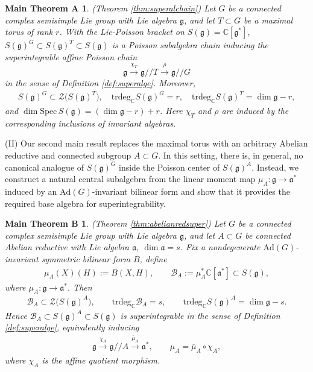 \documentclass[11pt,reqno]{amsart}
\newtheorem*{theorem A}{Main Theorem A}
\newtheorem*{theorem B}{Main Theorem B}
\newtheorem*{theorem C}{Main Theorem C}
\newtheorem*{theorem D}{Main Theorem D}
\theoremstyle{definition}
\theoremstyle{plain}
\theoremstyle{conclusion}
\begin{document}
\begin{theorem A} 
(Theorem \ref{thm:superalchain}) %
Let $G$ be a connected complex semisimple Lie group with Lie algebra $\mathfrak{g}$, and let $T\subset G$ be a maximal torus of rank $r$. With the Lie-Poisson bracket on $S(\mathfrak{g})=\mathbb{C}[\mathfrak{g}^*]$, $S(\mathfrak{g})^G\subset S(\mathfrak{g})^T\subset S(\mathfrak{g})$ is a Poisson subalgebra chain inducing the superintegrable affine Poisson chain
\begin{equation}
\mathfrak{g}\xrightarrow{\chi_T}\mathfrak{g}//T\xrightarrow{\rho}\mathfrak{g}//G
\label{eq:supgtc}
\end{equation}
in the sense of Definition \ref{def:superalge}. Moreover, \begin{align*}
S(\mathfrak{g})^G\subset\mathcal{Z}\bigl(S(\mathfrak{g})^T\bigr),\quad
\mathrm{trdeg}_{\mathbb{C}}S(\mathfrak{g})^G=r,\quad
\mathrm{trdeg}_{\mathbb{C}}S(\mathfrak{g})^T=\dim\mathfrak{g}-r,  
\end{align*} and $\dim\mathrm{Spec}\,S(\mathfrak{g})=(\dim\mathfrak{g}-r)+r$. Here $\chi_T$ and $\rho$ are induced by the corresponding inclusions of invariant algebras.
\end{theorem A}



(II) Our second main result replaces the maximal torus with an arbitrary Abelian reductive and connected subgroup $A \subset G$. In this setting, there is, in general, no canonical analogue of $S(\mathfrak{g})^G$ inside the Poisson center of $S(\mathfrak{g})^A$. Instead, we construct a natural central subalgebra from the linear moment map $\mu_A\colon\mathfrak{g}\to\mathfrak{a}^*$ induced by an $\mathrm{Ad}(G)$-invariant bilinear form and show that it provides the required base algebra for superintegrability.


\begin{theorem B}
  (Theorem \ref{thm:abelianredsuper})
Let $G$ be a connected complex semisimple Lie group with Lie algebra $\mathfrak{g}$, and let $A\subset G$ be connected Abelian reductive with Lie algebra $\mathfrak{a}$, $\dim\mathfrak{a}=s$. Fix a nondegenerate $\mathrm{Ad}(G)$-invariant symmetric bilinear form $B$, define \begin{align*}
    \mu_A(X)(H):=B(X,H),\qquad \mathcal{B}_A:=\mu_A^*\mathbb{C}[\mathfrak{a}^*]\subset S(\mathfrak{g}),
\end{align*} where $\mu_A:\mathfrak{g}\to\mathfrak{a}^*$. Then \begin{align*}
\mathcal{B}_A\subset\mathcal{Z}\bigl(S(\mathfrak{g})^A\bigr),\qquad
\mathrm{trdeg}_{\mathbb{C}}\mathcal{B}_A=s,\qquad
\mathrm{trdeg}_{\mathbb{C}}S(\mathfrak{g})^A=\dim\mathfrak{g}-s.
\end{align*} Hence $\mathcal{B}_A\subset S(\mathfrak{g})^A\subset S(\mathfrak{g})$ is superintegrable in the sense of Definition \ref{def:superalge}, equivalently inducing \begin{align*}
\mathfrak{g}\xrightarrow{\chi_A}\mathfrak{g}//A\xrightarrow{\overline{\mu}_A}\mathfrak{a}^*, \qquad \mu_A=\overline{\mu}_A\circ\chi_A,
\end{align*} where $\chi_A$ is the affine quotient morphism.
\end{theorem B}
\end{document}
